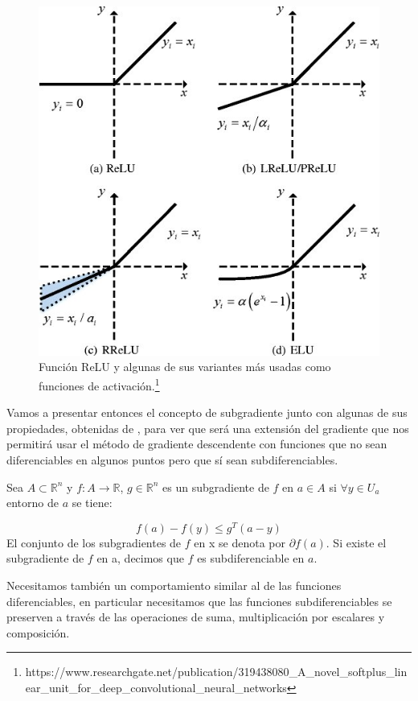 \begin{figure}
    \centering
    \includegraphics[width=0.5\linewidth]{3ReLU&oth.jpg}
    \caption{Función ReLU y algunas de sus variantes más usadas como funciones de activación.\footnote{https://www.researchgate.net/publication/319438080\_A\_novel\_softplus\_linear\_unit\_for\_deep\_convolutional\_neural\_networks}}
    \label{fig:3.ReLU}
\end{figure}



Vamos a presentar entonces el concepto de subgradiente junto con algunas de sus propiedades, obtenidas de \cite{convexSubgrad}, para ver que será una extensión del gradiente que nos permitirá usar el método de gradiente descendente con funciones que no sean diferenciables en algunos puntos pero que sí sean subdiferenciables.

\begin{definicion}[Subgradiente]
     Sea $A \subset \mathbb{R}^n$ y $f:A \rightarrow \mathbb{R}$, $g \in \mathbb{R}^n$ es un subgradiente de $f$ en $a \in A$ si $\forall y \in U_a$ entorno de $a$ se tiene:

    $$f(a)-f(y) \leq g^T(a-y)$$
    El conjunto de los subgradientes de $f$ en x se denota por $\partial f(a)$. Si existe el subgradiente de $f$ en a, decimos que $f$ es subdiferenciable en $a$.
\end{definicion}

Necesitamos también un comportamiento similar al de las funciones diferenciables, en particular necesitamos que las funciones subdiferenciables se preserven a través de las operaciones de suma, multiplicación por escalares y composición.

